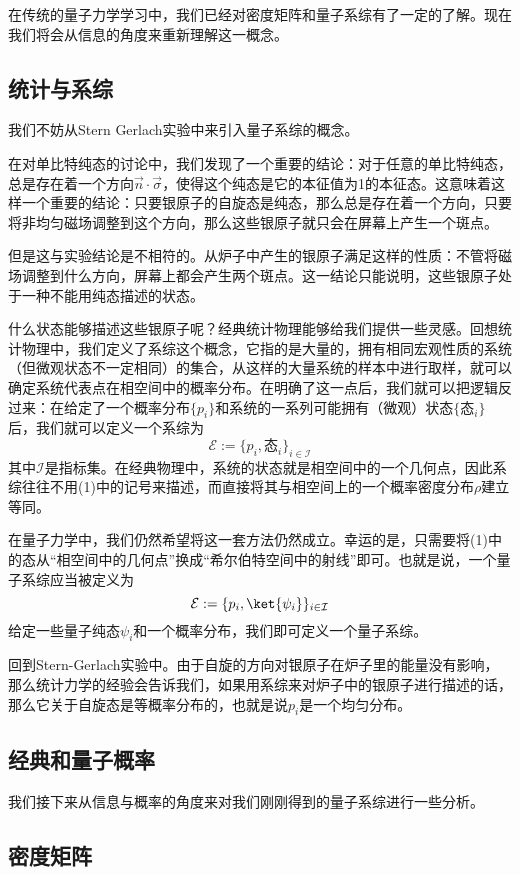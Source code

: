 
\begin{issues}
\issueDraft
\issueTODO
\end{issues}



在传统的量子力学学习中，我们已经对密度矩阵和量子系综有了一定的了解。现在我们将会从信息的角度来重新理解这一概念。

\subsection{统计与系综}

我们不妨从Stern Gerlach实验中来引入量子系综的概念。

在对单比特纯态的讨论中，我们发现了一个重要的结论：对于任意的单比特纯态，总是存在着一个方向$\vec{n}\cdot\vec{\sigma}$，使得这个纯态是它的本征值为1的本征态。这意味着这样一个重要的结论：只要银原子的自旋态是纯态，那么总是存在着一个方向，只要将非均匀磁场调整到这个方向，那么这些银原子就只会在屏幕上产生一个斑点。

但是这与实验结论是不相符的。从炉子中产生的银原子满足这样的性质：不管将磁场调整到什么方向，屏幕上都会产生两个斑点。这一结论只能说明，这些银原子处于一种不能用纯态描述的状态。

什么状态能够描述这些银原子呢？经典统计物理能够给我们提供一些灵感。回想统计物理中，我们定义了系综这个概念，它指的是大量的，拥有相同宏观性质的系统（但微观状态不一定相同）的集合，从这样的大量系统的样本中进行取样，就可以确定系统代表点在相空间中的概率分布。在明确了这一点后，我们就可以把逻辑反过来：在给定了一个概率分布$\{p_i\}$和系统的一系列可能拥有（微观）状态$\{\text{态}_i\}$后，我们就可以定义一个系综为
\begin{equation}
\mathcal{E}:=\{p_i, \text{态}_i\}_{i\in\mathcal{I}}
\end{equation}
其中$\mathcal{I}$是指标集。在经典物理中，系统的状态就是相空间中的一个几何点，因此系综往往不用(1)中的记号来描述，而直接将其与相空间上的一个概率密度分布$\rho$建立等同。

在量子力学中，我们仍然希望将这一套方法仍然成立。幸运的是，只需要将(1)中的态从“相空间中的几何点”换成“希尔伯特空间中的射线”即可。也就是说，一个量子系综应当被定义为
\begin{equation}
\mathcal{E}:=\{p_i,\ket{\psi_i}\}_{i\in\mathcal{I}}
\end{equation}给定一些量子纯态$\psi_i$和一个概率分布，我们即可定义一个量子系综。

回到Stern-Gerlach实验中。由于自旋的方向对银原子在炉子里的能量没有影响，那么统计力学的经验会告诉我们，如果用系综来对炉子中的银原子进行描述的话，那么它关于自旋态是等概率分布的，也就是说$p_i$是一个均匀分布。

\subsection{经典和量子概率}

我们接下来从信息与概率的角度来对我们刚刚得到的量子系综进行一些分析。

\subsection{密度矩阵}

